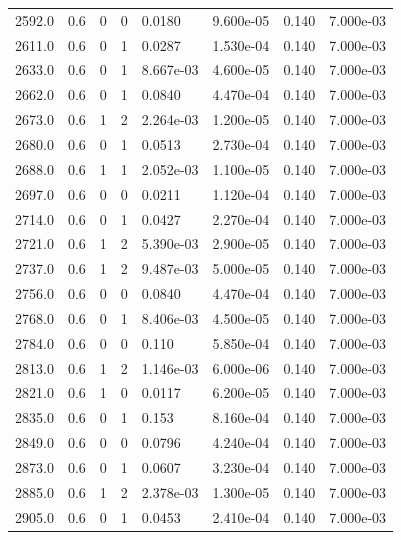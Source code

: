 \documentclass[preview]{standalone}
\begin{document}
{{{{{{\begin{tabular}{L{1.2cm}C{1.2cm} C{0.3cm}C{0.5cm} C{1.4cm}C{1.4cm} C{1.4cm}C{1.4cm}}
  2592.0  &   0.6  & 0     &  0 &  0.0180  & 9.600e-05  & 0.140 &  7.000e-03   \\ 
  2611.0  &   0.6  & 0     &  1 &  0.0287  & 1.530e-04  & 0.140 &  7.000e-03   \\ 
  2633.0  &   0.6  & 0     &  1 &  8.667e-03  & 4.600e-05  & 0.140 &  7.000e-03   \\ 
  2662.0  &   0.6  & 0     &  1 &  0.0840  & 4.470e-04  & 0.140 &  7.000e-03   \\ 
  2673.0  &   0.6  & 1     &  2 &  2.264e-03  & 1.200e-05  & 0.140 &  7.000e-03   \\ 
  2680.0  &   0.6  & 0     &  1 &  0.0513  & 2.730e-04  & 0.140 &  7.000e-03   \\ 
  2688.0  &   0.6  & 1     &  1 &  2.052e-03  & 1.100e-05  & 0.140 &  7.000e-03   \\ 
  2697.0  &   0.6  & 0     &  0 &  0.0211  & 1.120e-04  & 0.140 &  7.000e-03   \\ 
  2714.0  &   0.6  & 0     &  1 &  0.0427  & 2.270e-04  & 0.140 &  7.000e-03   \\ 
  2721.0  &   0.6  & 1     &  2 &  5.390e-03  & 2.900e-05  & 0.140 &  7.000e-03   \\ 
  2737.0  &   0.6  & 1     &  2 &  9.487e-03  & 5.000e-05  & 0.140 &  7.000e-03   \\ 
  2756.0  &   0.6  & 0     &  0 &  0.0840  & 4.470e-04  & 0.140 &  7.000e-03   \\ 
  2768.0  &   0.6  & 0     &  1 &  8.406e-03  & 4.500e-05  & 0.140 &  7.000e-03   \\ 
  2784.0  &   0.6  & 0     &  0 &  0.110  & 5.850e-04  & 0.140 &  7.000e-03   \\ 
  2813.0  &   0.6  & 1     &  2 &  1.146e-03  & 6.000e-06  & 0.140 &  7.000e-03   \\ 
  2821.0  &   0.6  & 1     &  0 &  0.0117  & 6.200e-05  & 0.140 &  7.000e-03   \\ 
  2835.0  &   0.6  & 0     &  1 &  0.153  & 8.160e-04  & 0.140 &  7.000e-03   \\ 
  2849.0  &   0.6  & 0     &  0 &  0.0796  & 4.240e-04  & 0.140 &  7.000e-03   \\ 
  2873.0  &   0.6  & 0     &  1 &  0.0607  & 3.230e-04  & 0.140 &  7.000e-03   \\ 
  2885.0  &   0.6  & 1     &  2 &  2.378e-03  & 1.300e-05  & 0.140 &  7.000e-03   \\ 
  2905.0  &   0.6  & 0     &  1 &  0.0453  & 2.410e-04  & 0.140 &  7.000e-03   \\ 

\end{tabular}}}}}}}
\end{document}
